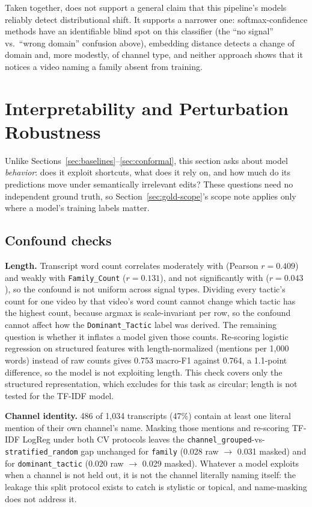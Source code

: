 \documentclass[preprint,12pt]{elsarticle}
\begin{document}
Taken together,  does not support a general claim
that this pipeline's models reliably detect distributional shift. It
supports a narrower one: softmax-confidence methods have an identifiable
blind spot on this classifier (the ``no signal'' vs.\ ``wrong domain''
confusion above), embedding distance detects a change of domain and, more
modestly, of channel type, and neither approach shows that it notices a
video naming a family absent from training.

\section{Interpretability and Perturbation Robustness}
\label{sec:interpretability}
Unlike Sections~\ref{sec:baselines}--\ref{sec:conformal}, this section asks
about model \emph{behavior}: does it exploit shortcuts, what does it rely on,
and how much do its predictions move under semantically irrelevant edits?
These questions need no independent ground truth, so
Section~\ref{sec:gold-scope}'s scope note applies only where a model's
training labels matter.

\subsection{Confound checks}
\label{sec:confounds}
\textbf{Length.} Transcript word count correlates moderately with
 (Pearson $r=0.409$) and weakly with
\texttt{Family\_Count} ($r=0.131$), and not significantly with
 ($r=0.043$), so the confound is not uniform across
signal types. Dividing every tactic's count for one video by that video's word
count cannot change which tactic has the highest count, because argmax is
scale-invariant per row, so the confound cannot affect how the
\texttt{Dominant\_Tactic} label was derived. The remaining question is whether
it inflates a model given those counts. Re-scoring logistic regression on
structured features with length-normalized (mentions per 1{,}000 words) instead
of raw counts gives 0.753 macro-F1 against 0.764, a 1.1-point difference, so
the model is not exploiting length. This check covers
only the structured representation, which  excludes for
this task as circular; length is not tested for the TF-IDF model.

\textbf{Channel identity.} 486 of 1{,}034 transcripts (47\%) contain at
least one literal mention of their own channel's name. Masking those
mentions and re-scoring TF-IDF LogReg under both CV protocols leaves the
\texttt{channel\_grouped}-vs-\texttt{stratified\_random} gap unchanged
for \texttt{family} (0.028 raw $\to$ 0.031 masked) and for
\texttt{dominant\_tactic} (0.020 raw $\to$ 0.029 masked). Whatever a
model exploits when a channel is not held out, it is not the channel
literally naming itself: the leakage this split protocol exists to catch is
stylistic or topical, and name-masking does not address it.
\end{document}
